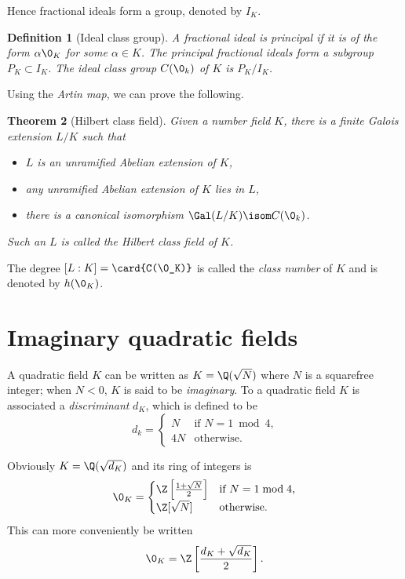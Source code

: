 \documentclass{article}
\newtheorem{theorem}{Theorem}
\newtheorem{definition}[theorem]{Definition}
\begin{document}
Hence fractional ideals form a group, denoted by $I_K$. 

\begin{definition}[Ideal class group]
  A fractional ideal is \emph{principal} if it is of the form
  $\alpha\0_K$ for some $\alpha\in K$. The principal fractional ideals
  form a subgroup $P_K\subset I_K$. The \emph{ideal class group}
  $C(\0_k)$ of $K$ is $P_K/I_K$.
\end{definition}

Using the \emph{Artin map}, we can prove the following.

\begin{theorem}[Hilbert class field]
  Given a number field $K$, there is a finite Galois extension $L/K$
  such that
  \begin{itemize}
  \item $L$ is an unramified Abelian extension of $K$,
  \item any unramified Abelian extension of $K$ lies in $L$,
  \item there is a canonical isomorphism $\Gal(L/K)\isom C(\0_k)$.
  \end{itemize}
  Such an $L$ is called the \emph{Hilbert class field} of $K$.
\end{theorem}

The degree $[L:K] = \card{C(\0_K)}$ is called the \emph{class number}
of $K$ and is denoted by $h(\0_K)$.


\section{Imaginary quadratic fields}

A quadratic field $K$ can be written as $K=\Q(\sqrt{N})$ where $N$ is
a squarefree integer; when $N<0$, $K$ is said to be
\emph{imaginary}. To a quadratic field $K$ is associated a
\emph{discriminant} $d_K$, which is defined to be
\begin{equation}
  \label{eq:1}
  d_k =
  \begin{cases}
    N &\text{if $N=1\bmod 4$,}\\
    4N & \text{otherwise.}
  \end{cases}
\end{equation}

Obviously $K=\Q(\sqrt{d_K})$ and its ring of integers is
\begin{equation}
  \label{eq:2}
  \0_K =
  \begin{cases}
    \Z\left[\frac{1+\sqrt{N}}{2}\right] & \text{if $N=1\bmod 4$,}\\
    \Z[\sqrt{N}] & \text{otherwise.}
  \end{cases}
\end{equation}
This can more conveniently be written
\begin{equation}
  \label{eq:3}
  \0_K = \Z\left[\frac{d_K+\sqrt{d_K}}{2}\right].
\end{equation}
\end{document}
